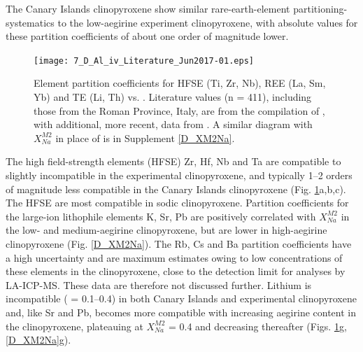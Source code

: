\documentclass[final,authoryear,3p,times,twocolumn]{elsarticle}
\begin{document}
  The Canary Islands clinopyroxene show similar rare-earth-element partitioning-systematics to the low-aegirine experiment clinopyroxene, with absolute values for these partition coefficients of about one order of magnitude lower.


        \begin{figure}[htp]
        \begin{center}
        \texttt{[image: 7\_D\_Al\_iv\_Literature\_Jun2017-01.eps]}
        \caption[Selected trace-element-partition coefficients vs. ]{Element partition coefficients for HFSE (Ti, Zr, Nb), REE (La, Sm, Yb) and TE (Li, Th) vs. . Literature values (n = 411), including those from the Roman Province, Italy, are from the compilation of \citet{Bedard2014}, with additional, more recent, data from \citet{Mollo2016}. A similar diagram with $X^{M2}_{Na}$ in place of  is in Supplement \ref{D_XM2Na}.}
        \label{7_Al_iv}
        \end{center}
        \end{figure}
The high field-strength elements (HFSE) Zr, Hf, Nb and Ta are compatible to slightly incompatible in the experimental clinopyroxene, and typically 1--2 orders of magnitude less compatible in the Canary Islands clinopyroxene (Fig. \ref{7_Al_iv}a,b,c). The HFSE are most compatible in sodic clinopyroxene.
	Partition coefficients for the large-ion lithophile elements K, Sr, Pb are positively correlated with $X_{Na}^{M2}$ in the low- and medium-aegirine clinopyroxene, but are lower in high-aegirine clinopyroxene (Fig. \ref{D_XM2Na}). The Rb, Cs and Ba partition coefficients have a high uncertainty and are maximum estimates owing to low concentrations of these elements in the clinopyroxene, close to the detection limit for analyses by LA-ICP-MS. These data are therefore not discussed further. 
	Lithium is incompatible ( = 0.1--0.4) in both Canary Islands and experimental clinopyroxene and, like Sr and Pb, becomes more compatible with increasing aegirine content in the clinopyroxene, plateauing at $X_{Na}^{M2}$ = 0.4 and decreasing thereafter (Figs. \ref{7_Al_iv}g, \ref{D_XM2Na}g). 
\end{document}
